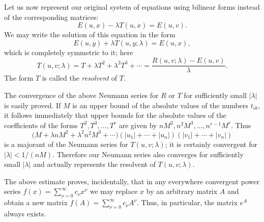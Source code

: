 Let us now represent our original system of equations using bilinear forms instead of the corresponding matrices:
\[
 E(u,x)-\lambda T(u,x)=E(u,v).
\]
We may write the solution of this equation in the form
\[
 E(u,y)+\lambda T(u,y;\lambda)=E(u,x),
\]
which is completely symmetric to it; here
\[
 T(u,v;\lambda)=T+\lambda T^2+\lambda^2T^3+\cdots
 =\frac{R(u,v;\lambda)-E(u,v)}{\lambda}.
\]
The form $T$ is called the \emph{resolvent} of $T$.

The convergence of the above Neumann series for $R$ or $T$ for sufficiently small $|\lambda|$ is easily proved. If $M$ is an upper bound of the absolute values of the numbers $t_{ik}$, it follows immediately that upper bounds for the absolute values of the coefficients of the forms $T^2,T^3,\ldots,T^r$ are given by $nM^2,n^2M^3,\ldots,n^{r-1}M^r$. Thus
\[
 \bigl(M+\lambda nM^2+\lambda^2n^2M^3+\cdots\bigr)
 (|u_1|+\cdots+|u_n|)(|v_1|+\cdots+|v_n|)
\]
is a majorant of the Neumann series for $T(u,v;\lambda)$; it is certainly convergent for $|\lambda|<1/(nM)$. Therefore our Neumann series also converges for sufficiently small $|\lambda|$ and actually represents the resolvent of $T(u,v;\lambda)$.

The above estimate proves, incidentally, that in any everywhere convergent power series $f(x)=\sum_{\nu=0}^{\infty}c_\nu x^\nu$ we may replace $x$ by an arbitrary matrix $A$ and obtain a new matrix $f(A)=\sum_{\nu=0}^{\infty}c_\nu A^\nu$. Thus, in particular, the matrix $e^A$ always exists.

